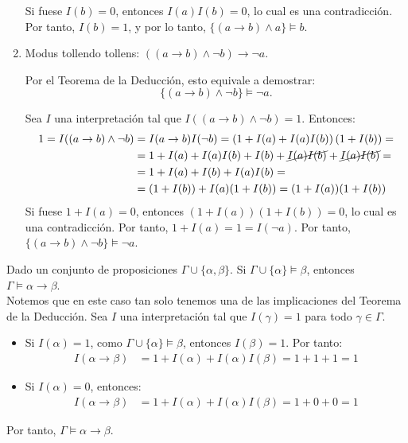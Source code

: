 \begin{ejercicio}
\begin{enumerate}
        Si fuese $I(b) = 0$, entonces $I(a)I(b) = 0$, lo cual es una contradicción. Por tanto, $I(b) = 1$, y por lo tanto, $\{(a \rightarrow b)\land a\} \vDash b$.
        \item Modus tollendo tollens: $((a \rightarrow b)\land \neg b) \rightarrow \neg a$.
        
        Por el Teorema de la Deducción, esto equivale a demostrar:
        \begin{equation*}
            \{(a \rightarrow b)\land \neg b\} \vDash \neg a.
        \end{equation*}

        Sea $I$ una interpretación tal que $I((a \rightarrow b)\land \neg b) = 1$. Entonces:
        \begin{align*}
            1=I((a \rightarrow b)\land \neg b) &= I(a \rightarrow b)I(\neg b) = \left(1+I(a)+I(a)I(b)\right)(1+I(b)) =\\&= 1+I(a)+I(a)I(b)+I(b)+\cancel{I(a)I(b)}+\cancel{I(a)I(b)} =\\&= 1+I(a)+I(b)+I(a)I(b)
            =\\&= (1+I(b)) + I(a)(1+I(b))
            = (1+I(a))(1+I(b))
        \end{align*}
        Si fuese $1+I(a) = 0$, entonces $(1+I(a))(1+I(b)) = 0$, lo cual es una contradicción. Por tanto, $1+I(a) = 1 = I(\neg a)$. Por tanto, $\{(a \rightarrow b)\land \neg b\} \vDash \neg a$.
    \end{enumerate}
\end{ejercicio}

\begin{ejercicio}\label{ej:1.3}
    Dado un conjunto de proposiciones $\Gamma \cup \{\alpha, \beta\}$. Si $\Gamma \cup \{\alpha\} \models \beta$, entonces $\Gamma \models \alpha \rightarrow \beta$.\\

    Notemos que en este caso tan solo tenemos una de las implicaciones del Teorema de la Deducción. Sea $I$ una interpretación tal que $I(\gamma)=1$ para todo $\gamma\in\Gamma$.
    \begin{itemize}
        \item Si $I(\alpha)=1$, como $\Gamma \cup \{\alpha\} \models \beta$, entonces $I(\beta)=1$. Por tanto:
        \begin{align*}
            I(\alpha\rightarrow\beta) &= 1+I(\alpha)+I(\alpha)I(\beta) = 1+1+1 = 1
        \end{align*}

        \item Si $I(\alpha)=0$, entonces:
        \begin{align*}
            I(\alpha\rightarrow\beta) &= 1+I(\alpha)+I(\alpha)I(\beta) = 1+0+0 = 1
        \end{align*}
    \end{itemize}

    Por tanto, $\Gamma \models \alpha \rightarrow \beta$.
\end{ejercicio}

